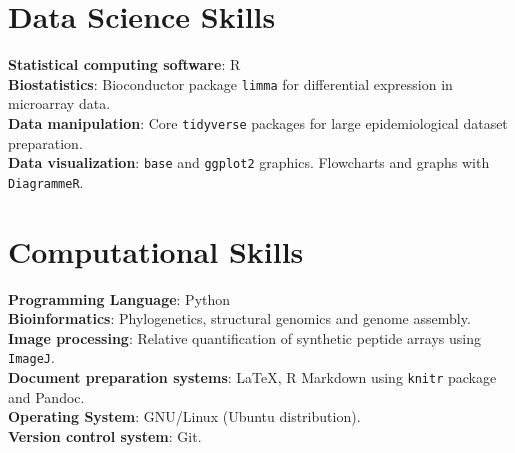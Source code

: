 \documentclass[margin,line]{res}
\begin{document}
\begin{resume}
\section{\sc Data Science Skills}%
{\bf Statistical computing software}: R\\ %
{\bf Biostatistics}: Bioconductor package \texttt{limma} for differential expression in microarray data.\\ %
{\bf Data manipulation}: Core \texttt{tidyverse} packages for large epidemiological dataset preparation.\\%
{\bf Data visualization}: \texttt{base} and \texttt{ggplot2} graphics. Flowcharts and graphs with \texttt{DiagrammeR}.\\ %

\section{\sc Computational Skills}
{\bf Programming Language}: Python\\%
{\bf Bioinformatics}: Phylogenetics, structural genomics and genome assembly.\\
{\bf Image processing}: Relative quantification of synthetic peptide arrays using \texttt{ImageJ}.\\
{\bf Document preparation systems}: LaTeX, R Markdown using \texttt{knitr} package and Pandoc.\\ 
{\bf Operating System}: GNU/Linux (Ubuntu distribution).\\ %
{\bf Version control system}: Git.\\ %


\end{resume}
\end{document}
